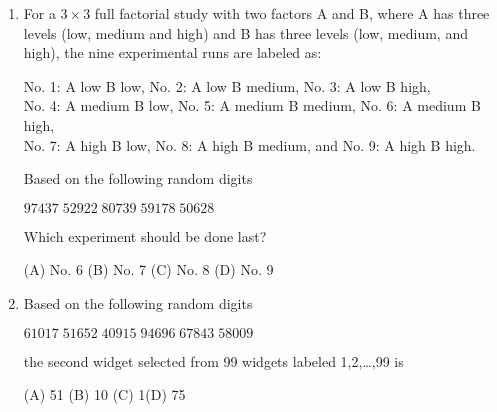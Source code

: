 \documentclass[11pt]{article}
\begin{document}
{\begin{enumerate}
(A) 1024 \hspace{0.5cm}(B) 6561 \hspace{0.5cm}(C) 512
\hspace{0.5cm}(D) none of these

\vskip -0.7cm \hspace{6in}\fbox{
\textcolor[rgb]{1.00,1.00,1.00}{$\bigcap$}}


\item[(d)] For a $3 \times 3$ full factorial study with two factors A and B, where
A has three levels (low, medium and high) and B has three levels (low, medium,
and high), the nine experimental runs are labeled as:

No. 1: A low B low, \hspace{0.5cm} No. 2: A low B medium,
\hspace{0.5cm} No. 3: A low B high, \\ 
No. 4: A medium B low,
No. 5: A medium B medium, No. 6: A medium B high, \\ No. 7: A high B low,
\hspace{0.5cm} No. 8: A high B medium, \hspace{0.1 cm}and
\hspace{0.1cm} No. 9: A high B high.

\noindent Based on the following random digits

\hspace{3.5cm}$97437 \; 52922 \; 80739 \; 59178 \; 50628$

Which experiment should be done last?

(A) No. 6 \hspace{0.5cm}(B) No. 7 \hspace{0.5cm}(C) No. 8
\hspace{0.5cm}(D) No. 9

\vskip -0.7cm \hspace{6in}\fbox{
\textcolor[rgb]{1.00,1.00,1.00}{$\bigcap$}}


\item[(e)] Based on the following random digits

\hspace{3.5cm}$ 61017 \;51652 \; 40915 \; 94696 \; 67843 \; 58009$

the second widget selected from 99 widgets labeled 1,2,\ldots ,99 is

(A) 51 \hspace{0.5cm}(B) 10 \hspace{0.5cm}(C) 1\hspace{0.5cm}(D)
75


\end{enumerate}}
\end{document}
